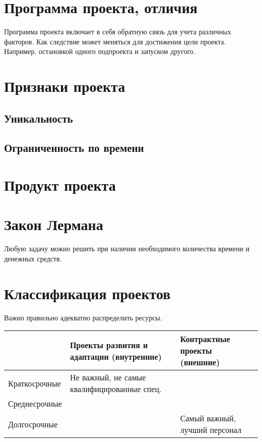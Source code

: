\section{Программа проекта, отличия}
Программа проекта включает в себя обратную связь для учета различных факторов. Как следствие может меняться для достижения цели проекта. Например, остановкой одного подпроекта и запуском другого.

\section{Признаки проекта}

\subsection{Уникальность}
\subsection{Ограниченность по времени}

\section{Продукт проекта}

\section{Закон Лермана}
Любую задачу можно решить при наличии необходимого количества времени и денежных средств.

\section{Классификация проектов}

Важно правильно адекватно распределить ресурсы.

\begin{table}[h!]
\begin{tabular}{|l|l|l|}
\hline
              & Проекты развития и адаптации (внутренние)   & Контрактные проекты (внешние) \\ \hline
Краткосрочные & Не важный, не самые квалифицированные спец. &                               \\ \hline
Среднесрочные &                                             &                               \\ \hline
Долгосрочные  &                                             & Самый важный, лучший персонал \\ \hline
\end{tabular}
\end{table}


